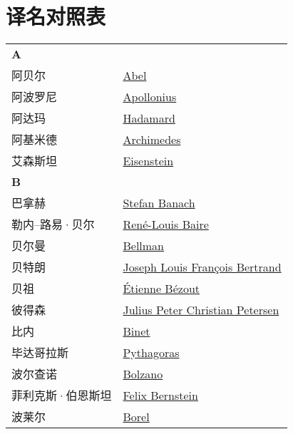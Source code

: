 \chapter{译名对照表}
\def\InsertTable#1{\begin{longtable}{ll} #1 \end{longtable}}%
\InsertTable{
	\textbf{A} \\
	阿贝尔 & \href{https://mathshistory.st-andrews.ac.uk/Biographies/Abel/}{Abel} \\
	阿波罗尼 & \href{https://mathshistory.st-andrews.ac.uk/Biographies/Apollonius/}{Apollonius} \\
	阿达玛 & \href{https://mathshistory.st-andrews.ac.uk/Biographies/Hadamard/}{Hadamard} \\
	阿基米德 & \href{https://mathshistory.st-andrews.ac.uk/Biographies/Archimedes/}{Archimedes} \\
	艾森斯坦 & \href{https://mathshistory.st-andrews.ac.uk/Biographies/Eisenstein/}{Eisenstein} \\
	\textbf{B} \\
	巴拿赫 & \href{https://mathshistory.st-andrews.ac.uk/Biographies/Banach/}{Stefan Banach} \\
	勒内--路易·贝尔 & \href{https://mathshistory.st-andrews.ac.uk/Biographies/Baire/}{Ren\'e-Louis Baire} \\
	贝尔曼 & \href{https://mathshistory.st-andrews.ac.uk/Biographies/Bellman/}{Bellman} \\
	贝特朗 & \href{https://mathshistory.st-andrews.ac.uk/Biographies/Bertrand/}{Joseph Louis Fran\c cois Bertrand} \\
	贝祖 & \href{https://mathshistory.st-andrews.ac.uk/Biographies/Bezout/}{\'Etienne B\'ezout} \\
	彼得森 & \href{https://mathshistory.st-andrews.ac.uk/Biographies/Petersen/}{Julius Peter Christian Petersen} \\
	比内 & \href{https://mathshistory.st-andrews.ac.uk/Biographies/Binet/}{Binet} \\
	毕达哥拉斯 & \href{https://mathshistory.st-andrews.ac.uk/Biographies/Pythagoras/}{Pythagoras} \\
	波尔查诺 & \href{https://mathshistory.st-andrews.ac.uk/Biographies/Bolzano/}{Bolzano} \\
	菲利克斯·伯恩斯坦 & \href{https://mathshistory.st-andrews.ac.uk/Biographies/Bernstein_Felix/}{Felix Bernstein} \\
	波莱尔 & \href{https://mathshistory.st-andrews.ac.uk/Biographies/Borel/}{Borel} \\
}
